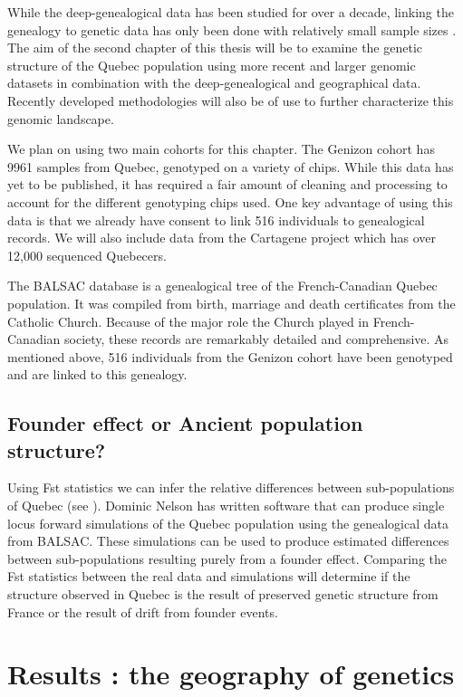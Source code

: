 \documentclass[
11pt, %
oneside, %
english, %
doublespacing, %
headsepline, %
chapterinoneline, %
]{MastersDoctoralThesis} %
\begin{document}
While the deep-genealogical data has been studied for over a decade, linking the genealogy to genetic data has only been done with relatively small sample sizes \citep{Gagnon2001,Roy-Gagnon2011}.
The aim of the second chapter of this thesis will be to examine the genetic structure of the Quebec population using more recent and larger genomic datasets in combination with the deep-genealogical and geographical data. 
Recently developed methodologies will also be of use to further characterize this genomic landscape.

We plan on using two main cohorts for this chapter. 
The Genizon cohort has 9961 samples from Quebec, genotyped on a variety of chips.
While this data has yet to be published, it has required a fair amount of cleaning and processing to account for the different genotyping chips used.
One key advantage of using this data is that we already have consent to link 516 individuals to genealogical records.
We will also include data from the Cartagene project which has over 12,000 sequenced Quebecers.

The BALSAC database is a genealogical tree of the French-Canadian Quebec population.
It was compiled from birth, marriage and death certificates from the Catholic Church.
Because of the major role the Church played in French-Canadian society, these records are remarkably detailed and comprehensive.
As mentioned above, 516 individuals from the Genizon cohort have been genotyped and are linked to this genealogy.

\subsection{Founder effect or Ancient population structure?}
Using Fst statistics we can infer the relative differences between sub-populations of Quebec (see \citep{Roy-Gagnon2011}).
Dominic Nelson has written software that can produce single locus forward simulations of the Quebec population using the genealogical data from BALSAC.
These simulations can be used to produce estimated differences between sub-populations resulting purely from a founder effect.
Comparing the Fst statistics between the real data and simulations will determine if the structure observed in Quebec is the result of preserved genetic structure from France or the result of drift from founder events.

\section{Results : the geography of genetics}
\end{document}
